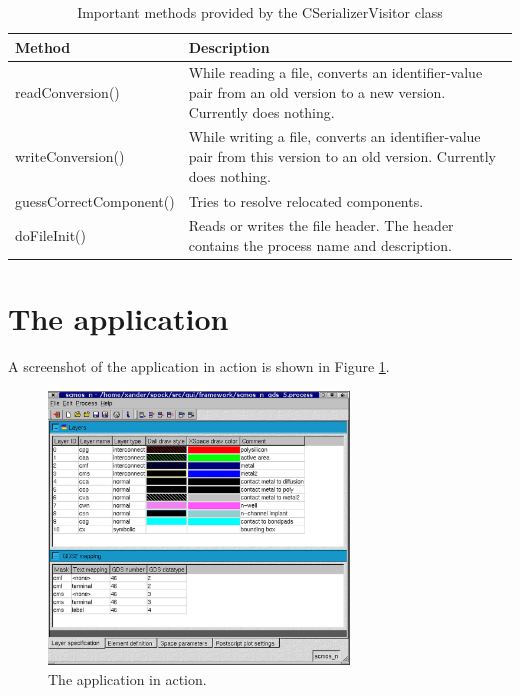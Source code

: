 \begin{table} \begin{center}
\caption{Important methods provided by the CSerializerVisitor class}
\label{tab:design:CSerializerVisitor}
\begin{tabular}{l|p{6cm}}
\hline
 \textsf{Method}                  & \textsf{Description}                                                                                                  \\
\hline
 \textsf{readConversion()}        & While reading a file, converts an identifier-value pair from an old version to a new version. Currently does nothing. \\
 \textsf{writeConversion()}       & While writing a file, converts an identifier-value pair from this version to an old version. Currently does nothing.  \\
 \textsf{guessCorrectComponent()} & Tries to resolve relocated components.                                                                                \\
 \textsf{doFileInit()}            & Reads or writes the file header. The header contains the process name and description.                                \\
\hline
\end{tabular}
\end{center} \end{table}

\section{The application}
A screenshot of the application in action is shown in Figure
\ref{fig:design:app_screenshot}.

\begin{figure} \begin{center}
\includegraphics[width=8cm]{./figures/app_action.eps}
\caption{The application in action.}
\label{fig:design:app_screenshot}
\end{center} \end{figure}


